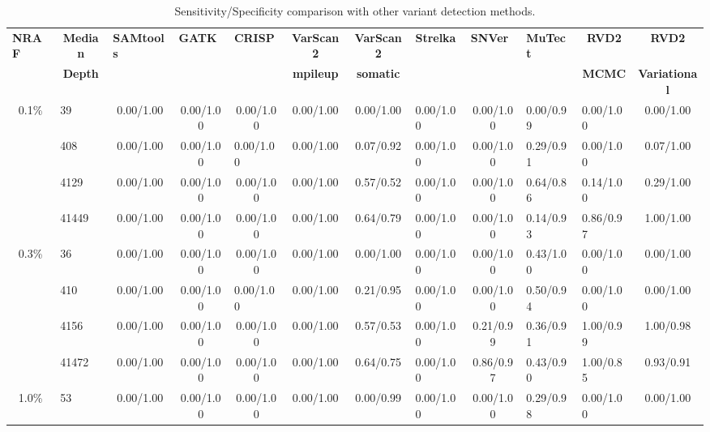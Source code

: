 \documentclass{bmcart}
\begin{document}
\begin{backmatter}
\begin{table}[htbp]
  \centering
\caption{Sensitivity/Specificity comparison with other variant detection methods.}%
  \tiny
    \begin{tabular}{cl|ccccclcllc}
    \toprule
    \multicolumn{1}{l}{\textbf{NRAF}} & \multicolumn{1}{c|}{\textbf{Median }} & \multicolumn{1}{l}{\textbf{SAMtools}} & \multicolumn{1}{l}{\textbf{GATK}} & \multicolumn{1}{l}{\textbf{CRISP}} & \textbf{VarScan2 } & \textbf{VarScan2 } & \textbf{Strelka} & \multicolumn{1}{l}{\textbf{SNVer}} & \textbf{MuTect} & \multicolumn{1}{c}{\textbf{RVD2}} & \textbf{RVD2} \\
          & \multicolumn{1}{c|}{\textbf{Depth}} &       &       &       & \textbf{mpileup} & \textbf{somatic} &       &       &       & \multicolumn{1}{c}{\textbf{MCMC}} & \textbf{Variational} \\
    \midrule
    0.1\% & 39    & 0.00/1.00 & 0.00/1.00 & 0.00/1.00 & 0.00/1.00 & 0.00/1.00 & 0.00/1.00 & 0.00/1.00 & 0.00/0.99 & 0.00/1.00 & 0.00/1.00 \\
          & 408   & 0.00/1.00 & 0.00/1.00 & \multicolumn{1}{l}{0.00/1.00} & 0.00/1.00 & 0.07/0.92 & 0.00/1.00 & 0.00/1.00 & 0.29/0.91 & 0.00/1.00 & 0.07/1.00 \\
          & 4129  & 0.00/1.00 & 0.00/1.00 & 0.00/1.00 & 0.00/1.00 & 0.57/0.52 & 0.00/1.00 & 0.00/1.00 & 0.64/0.86 & 0.14/1.00 & 0.29/1.00 \\
          & 41449 & 0.00/1.00 & 0.00/1.00 & 0.00/1.00 & 0.00/1.00 & 0.64/0.79 & 0.00/1.00 & 0.00/1.00 & 0.14/0.93 & 0.86/0.97 & 1.00/1.00 \\
    \midrule
    0.3\% & 36    & 0.00/1.00 & 0.00/1.00 & 0.00/1.00 & 0.00/1.00 & 0.00/1.00 & 0.00/1.00 & 0.00/1.00 & 0.43/1.00 & 0.00/1.00 & 0.00/1.00 \\
          & 410   & 0.00/1.00 & 0.00/1.00 & \multicolumn{1}{l}{0.00/1.00} & 0.00/1.00 & 0.21/0.95 & 0.00/1.00 & 0.00/1.00 & 0.50/0.94 & 0.00/1.00 & 0.00/1.00 \\
          & 4156  & 0.00/1.00 & 0.00/1.00 & 0.00/1.00 & 0.00/1.00 & 0.57/0.53 & 0.00/1.00 & 0.21/0.99 & 0.36/0.91 & 1.00/0.99 & 1.00/0.98 \\
          & 41472 & 0.00/1.00 & 0.00/1.00 & 0.00/1.00 & 0.00/1.00 & 0.64/0.75 & 0.00/1.00 & 0.86/0.97 & 0.43/0.90 & 1.00/0.85 & 0.93/0.91 \\
    \midrule
    1.0\% & 53    & 0.00/1.00 & 0.00/1.00 & 0.00/1.00 & 0.00/1.00 & 0.00/0.99 & 0.00/1.00 & 0.00/1.00 & 0.29/0.98 & 0.00/1.00 & 0.00/1.00 \\

\end{tabular}
\end{table}
\end{backmatter}
\end{document}
